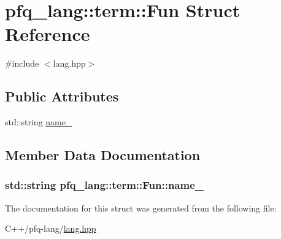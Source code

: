 \hypertarget{structpfq__lang_1_1term_1_1Fun}{\section{pfq\-\_\-lang\-:\-:term\-:\-:Fun Struct Reference}
\label{structpfq__lang_1_1term_1_1Fun}
}


{\ttfamily \#include $<$lang.\-hpp$>$}

\subsection*{Public Attributes}
\begin{DoxyCompactItemize}
\item 
std\-::string \hyperlink{structpfq__lang_1_1term_1_1Fun_a22db9b575894dc5a7e869ddf410a64b4}{name\-\_\-}
\end{DoxyCompactItemize}


\subsection{Member Data Documentation}
\hypertarget{structpfq__lang_1_1term_1_1Fun_a22db9b575894dc5a7e869ddf410a64b4}{
\subsubsection[{name\-\_\-}]{\setlength{\rightskip}{0pt plus 5cm}std\-::string pfq\-\_\-lang\-::term\-::\-Fun\-::name\-\_\-}}\label{structpfq__lang_1_1term_1_1Fun_a22db9b575894dc5a7e869ddf410a64b4}


The documentation for this struct was generated from the following file\-:\begin{DoxyCompactItemize}
\item 
C++/pfq-\/lang/\hyperlink{lang_8hpp}{lang.\-hpp}\end{DoxyCompactItemize}
